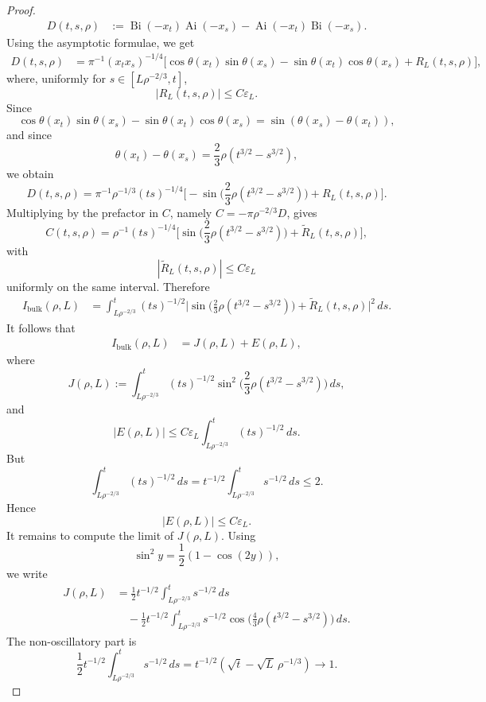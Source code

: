 \documentclass[10pt,a4paper]{amsart}
\newcommand{\Ai}{\operatorname{Ai}}
\newcommand{\Bi}{\operatorname{Bi}}
\begin{document}
\begin{proof}
\[
\begin{aligned}
D(t,s,\rho)
&:=
\Bi(-x_t)\Ai(-x_s)
-
\Ai(-x_t)\Bi(-x_s).
\end{aligned}
\]
Using the asymptotic formulae, we get
\[
\begin{aligned}
D(t,s,\rho)
&=
\pi^{-1}(x_tx_s)^{-1/4}
\Big[
 \cos\theta(x_t)\sin\theta(x_s)
 -
 \sin\theta(x_t)\cos\theta(x_s)
 +
 R_L(t,s,\rho)
\Big],
\end{aligned}
\]
where, uniformly for \(s\in[L\rho^{-2/3},t]\),
\[
  |R_L(t,s,\rho)|\le C\varepsilon_L .
\]
Since
\[
  \cos\theta(x_t)\sin\theta(x_s)
  -
  \sin\theta(x_t)\cos\theta(x_s)
  =
  \sin(\theta(x_s)-\theta(x_t)),
\]
and since
\[
  \theta(x_t)-\theta(x_s)
  =
  \frac23 \rho(t^{3/2}-s^{3/2}),
\]
we obtain
\[
D(t,s,\rho)
=
\pi^{-1}\rho^{-1/3}(ts)^{-1/4}
\Big[
 -\sin\Big(\frac23\rho(t^{3/2}-s^{3/2})\Big)
 +
 R_L(t,s,\rho)
\Big].
\]
Multiplying by the prefactor in \(C\), namely \(C=-\pi\rho^{-2/3}D\), gives
\[
C(t,s,\rho)
=
\rho^{-1}(ts)^{-1/4}
\Big[
 \sin\Big(\frac23\rho(t^{3/2}-s^{3/2})\Big)
 +
 \widetilde R_L(t,s,\rho)
\Big],
\]
with
\[
  |\widetilde R_L(t,s,\rho)|\le C\varepsilon_L
\]
uniformly on the same interval. Therefore
\[
\begin{aligned}
I_{\mathrm{bulk}}(\rho,L)
&=
\int_{L\rho^{-2/3}}^t
(ts)^{-1/2}
\Big|
 \sin\Big(\frac23\rho(t^{3/2}-s^{3/2})\Big)
 +
 \widetilde R_L(t,s,\rho)
\Big|^2\,ds .
\end{aligned}
\]
It follows that
\[
\begin{aligned}
I_{\mathrm{bulk}}(\rho,L)
&=
J(\rho,L)+E(\rho,L),
\end{aligned}
\]
where
\[
  J(\rho,L)
  :=
  \int_{L\rho^{-2/3}}^t
  (ts)^{-1/2}
  \sin^2\Big(\frac23\rho(t^{3/2}-s^{3/2})\Big)\,ds,
\]
and
\[
  |E(\rho,L)|
  \le
  C\varepsilon_L
  \int_{L\rho^{-2/3}}^t (ts)^{-1/2}\,ds .
\]
But
\[
  \int_{L\rho^{-2/3}}^t (ts)^{-1/2}\,ds
  =
  t^{-1/2}
  \int_{L\rho^{-2/3}}^t s^{-1/2}\,ds
  \le 2.
\]
Hence
\[
  |E(\rho,L)|\le C\varepsilon_L .
\]
It remains to compute the limit of \(J(\rho,L)\). Using
\[
  \sin^2 y=\frac12(1-\cos(2y)),
\]
we write
\[
\begin{aligned}
J(\rho,L)
&=
\frac12 t^{-1/2}
\int_{L\rho^{-2/3}}^t s^{-1/2}\,ds        \\
&\quad
-
\frac12 t^{-1/2}
\int_{L\rho^{-2/3}}^t
s^{-1/2}
\cos\Big(\frac43\rho(t^{3/2}-s^{3/2})\Big)\,ds .
\end{aligned}
\]
The non-oscillatory part is
\[
  \frac12 t^{-1/2}
  \int_{L\rho^{-2/3}}^t s^{-1/2}\,ds
  =
  t^{-1/2}
  \left(\sqrt t-\sqrt L\,\rho^{-1/3}\right)
  \longrightarrow 1 .
\]
\end{proof}
\end{document}
